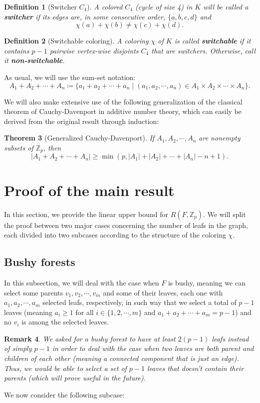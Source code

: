 \documentclass{article}
\numberwithin{table}{section}
\newtheorem{theorem}{Theorem}
\newtheorem{rem}[theorem]{Remark}
\newtheorem{defin}[theorem]{Definition}
\begin{document}
\begin{defin}[Switcher $C_4$]\label{def:cccolorings}
    A colored $C_4$ (cycle of size 4) in $K$ will be called a \textbf{switcher} if its edges are, in some consecutive order, $\{a,b,c,d\}$ and 
    $$\chi(a)+\chi(b) \neq \chi (c)+\chi(d).$$
\end{defin}
\begin{defin}[Switchable coloring]
    A coloring $\chi$ of $K$ is called \textbf{switchable} if it contains $p-1$ pairwise vertex-wise disjoints $C_4$ that are switchers. Otherwise, call it \textbf{non-switchable}.
\end{defin}
\medskip
As usual, we will use the sum-set notation:
$$A_1+A_2+\cdots+A_n\coloneq \{a_1+a_2+\cdots+a_n\mid (a_1,a_2,\cdots,a_n)\in A_1\times A_2\times\cdots\times A_n\}.$$

\medskip
We will also make extensive use of the following generalization of the classical theorem of Cauchy-Davenport in additive number theory, which can easily be derived from the original result through induction:

\begin{theorem}[Generalized Cauchy-Davenport] \label{thm:CauDav}
    If $A_1,A_2,\cdots,A_n$ are nonempty subsets of $\mathbb{Z}_p$, then
    $$|A_1+A_2+\cdots+A_n| \geq \min(p,|A_1|+|A_2|+\cdots+|A_n|-n+1).$$
\end{theorem}



\section{Proof of the main result} \label{sec: UB}

In this section, we provide the linear upper bound for $R(F,\mathbb{Z}_p)$. We will split the proof between two major cases concerning the number of leafs in the graph, each divided into two subcases according to the structure of the coloring $\chi$.

\subsection{Bushy forests}\label{subsec:1mod3reg}

In this subsection, we will deal with the case when $F$ is bushy, meaning we can select some parents $v_1,v_2,\cdots,v_m$ and some of their leaves, each one with $a_1,a_2,\cdots,a_m$ selected leafs, respectively, in such way that we select a total of $p-1$ leaves (meaning $a_i\geq 1$ for all $i\in\{1,2,\cdots,m\}$ and $a_1+a_2
+\cdots+a_m=p-1$) and no $v_i$ is among the selected leaves.
\begin{rem}
    We asked for a bushy forest to have at least $2(p-1)$ leafs instead of simply $p-1$ in order to deal with the case when two leaves are both parent and children of each other (meaning a connected component that is just an edge). Thus, we would be able to select a set of $p-1$ leaves that doesn't contain their parents (which will prove useful in the future).
\end{rem}
We now consider the following subcase:
\end{document}
